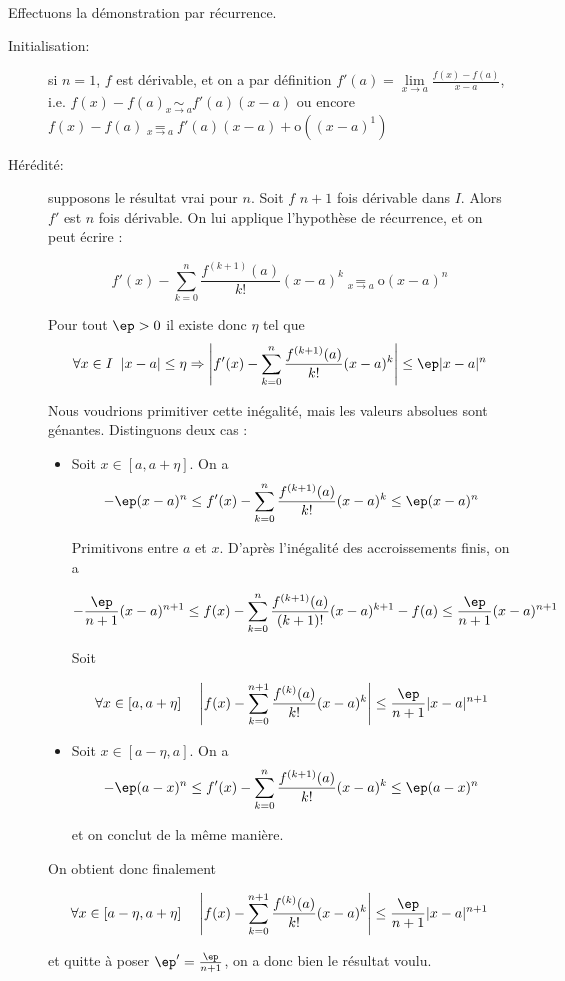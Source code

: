 \documentclass[12pt]{article}
\begin{document}
\begin{demo}~

Effectuons la démonstration par récurrence.
  
\begin{description}
\item[Initialisation:] si $n=1$, $f$ est dérivable, et on a par définition
  $f'(a)=\underset{x\rightarrow a}{\lim}\frac{f(x)-f(a)}{x-a}$, i.e. $f(x)-f(a)\underset{x\rightarrow a}{\sim} f'(a)(x-a)$ ou
  encore $f(x)-f(a) \underset{x\rightarrow a}{=} f'(a)(x-a)+\text{o}((x-a)^1)$

\item[Hérédité:] supposons le résultat vrai pour $n$. Soit $f$ $n+1$ fois dérivable
  dans $I$. Alors $f'$ est $n$ fois dérivable. On lui applique l'hypothèse
  de récurrence, et on peut écrire :

$$f'(x)-\sum_{k=0}^n\frac{f^{(k+1)}(a)}{k!}(x-a)^k\underset{x\rightarrow a}{=}\text{o}(x-a)^n$$

Pour tout $\ep>0$ il existe donc $\eta$ tel que $$\forall x\in I\;\;|x-a|\leq\eta \Rightarrow
\left|f'(x)-\sum_{k=0}^n\frac{f^{(k+1)}(a)}{k!}(x-a)^k\right| \leq \ep |x-a|^n$$

Nous voudrions primitiver cette inégalité, mais les valeurs absolues sont
génantes. Distinguons deux cas :

\begin{itemize}

\item Soit $x\in [a, a+\eta]$. On a $$-\ep (x-a)^n \leq f'(x)-\sum_{k=0}^n\frac{f^{(k+1)}(a)}{k!}(x-a)^k \leq \ep (x-a)^n$$

Primitivons entre $a$ et $x$. D'après l'inégalité des accroissements finis, on a 


$$-\frac{\ep}{n+1}(x-a)^{n+1}\leq f(x)-\sum_{k=0}^n\frac{f^{(k+1)}(a)}{(k+1)!}(x-a)^{k+1}-f(a)\leq\frac{\ep}{n+1} (x-a)^{n+1}$$

Soit 

$$\forall x\in [a, a+\eta]\;\;\;\;\left|f(x)-\sum_{k=0}^{n+1}\frac{f^{(k)}(a)}{k!}(x-a)^{k}\right|\leq\frac{\ep}{n+1} |x-a|^{n+1}$$

\item Soit $x\in [a-\eta, a]$. On a $$-\ep (a-x)^n \leq f'(x)-\sum_{k=0}^n\frac{f^{(k+1)}(a)}{k!}(x-a)^k \leq \ep (a-x)^n$$

et on conclut de la même manière.

\end{itemize}

On obtient donc finalement 

$$\forall x\in [a-\eta, a+\eta]\;\;\;\;\left|f(x)-\sum_{k=0}^{n+1}\frac{f^{(k)}(a)}{k!}(x-a)^{k}\right|\leq\frac{\ep}{n+1} |x-a|^{n+1}$$

et quitte à poser $\ep'=\frac{\ep}{n+1}$, on a donc bien le résultat voulu.

\end{description}

\end{demo}
\end{document}

